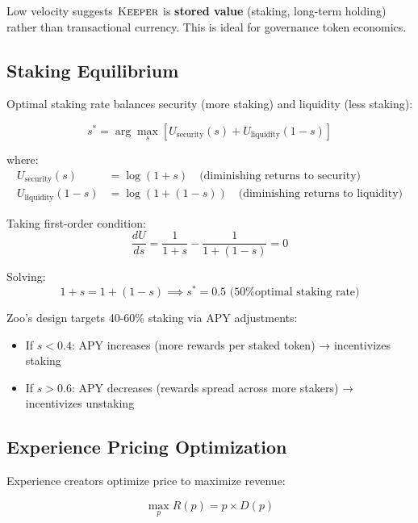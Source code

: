 \documentclass[11pt,letterpaper]{article}
\theoremstyle{definition}
\theoremstyle{remark}
\newcommand{\KEEPER}{\textsc{Keeper}}
\begin{document}
Low velocity suggests $\KEEPER$ is \textbf{stored value} (staking, long-term holding) rather than transactional currency. This is ideal for governance token economics.

\subsection{Staking Equilibrium}

Optimal staking rate balances security (more staking) and liquidity (less staking):

\begin{equation}
s^* = \arg\max_{s} \left[ U_{\text{security}}(s) + U_{\text{liquidity}}(1-s) \right]
\end{equation}

where:
\begin{align}
U_{\text{security}}(s) &= \log(1 + s) \quad \text{(diminishing returns to security)} \\
U_{\text{liquidity}}(1-s) &= \log(1 + (1-s)) \quad \text{(diminishing returns to liquidity)}
\end{align}

Taking first-order condition:
\begin{equation}
\frac{dU}{ds} = \frac{1}{1+s} - \frac{1}{1+(1-s)} = 0
\end{equation}

Solving:
\begin{equation}
1 + s = 1 + (1 - s) \implies s^* = 0.5 \text{ (50\% optimal staking rate)}
\end{equation}

Zoo's design targets 40-60\% staking via APY adjustments:
\begin{itemize}
\item If $s < 0.4$: APY increases (more rewards per staked token) → incentivizes staking
\item If $s > 0.6$: APY decreases (rewards spread across more stakers) → incentivizes unstaking
\end{itemize}

\subsection{Experience Pricing Optimization}

Experience creators optimize price to maximize revenue:

\begin{equation}
\max_{p} R(p) = p \times D(p)
\end{equation}
\end{document}

